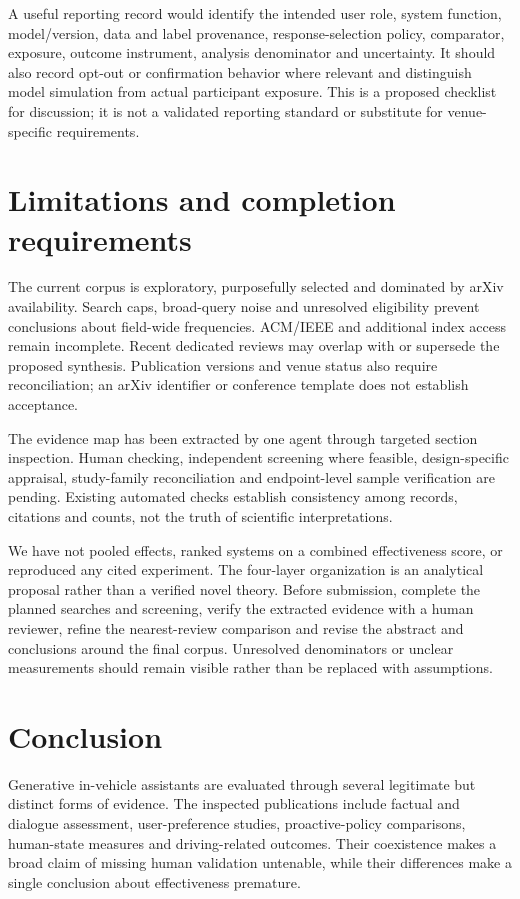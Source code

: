 \documentclass[11pt,a4paper]{article}
\begin{document}
A useful reporting record would identify the intended user role, system
function, model/version, data and label provenance, response-selection
policy, comparator, exposure, outcome instrument, analysis denominator
and uncertainty. It should also record opt-out or confirmation behavior
where relevant and distinguish model simulation from actual participant
exposure. This is a proposed checklist for discussion; it is not a
validated reporting standard or substitute for venue-specific
requirements.

\section{Limitations and completion
requirements}\label{limitations-and-completion-requirements}

The current corpus is exploratory, purposefully selected and dominated
by arXiv availability. Search caps, broad-query noise and unresolved
eligibility prevent conclusions about field-wide frequencies. ACM/IEEE
and additional index access remain incomplete. Recent dedicated reviews
may overlap with or supersede the proposed synthesis. Publication
versions and venue status also require reconciliation; an arXiv
identifier or conference template does not establish acceptance.

The evidence map has been extracted by one agent through targeted
section inspection. Human checking, independent screening where
feasible, design-specific appraisal, study-family reconciliation and
endpoint-level sample verification are pending. Existing automated
checks establish consistency among records, citations and counts, not
the truth of scientific interpretations.

We have not pooled effects, ranked systems on a combined effectiveness
score, or reproduced any cited experiment. The four-layer organization
is an analytical proposal rather than a verified novel theory. Before
submission, complete the planned searches and screening, verify the
extracted evidence with a human reviewer, refine the nearest-review
comparison and revise the abstract and conclusions around the final
corpus. Unresolved denominators or unclear measurements should remain
visible rather than be replaced with assumptions.

\section{Conclusion}\label{conclusion}

Generative in-vehicle assistants are evaluated through several
legitimate but distinct forms of evidence. The inspected publications
include factual and dialogue assessment, user-preference studies,
proactive-policy comparisons, human-state measures and driving-related
outcomes. Their coexistence makes a broad claim of missing human
validation untenable, while their differences make a single conclusion
about effectiveness premature.
\end{document}
